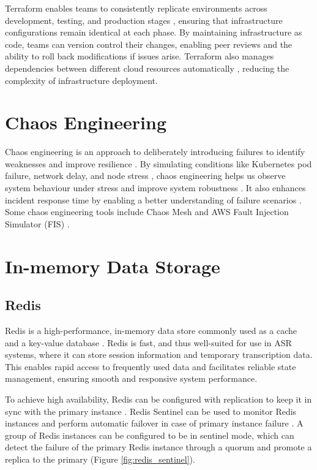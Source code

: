 Terraform enables teams to consistently replicate environments across development, testing, and production stages \cite{iac_benefits}, ensuring that infrastructure configurations remain identical at each phase. By maintaining infrastructure as code, teams can version control their changes, enabling peer reviews and the ability to roll back modifications if issues arise. Terraform also manages dependencies between different cloud resources automatically \cite{terraform_dependencies}, reducing the complexity of infrastructure deployment. 

\section{Chaos Engineering}
Chaos engineering is an approach to deliberately introducing failures to identify weaknesses and improve resilience \cite{chaos_engineering_definition}. By simulating conditions like Kubernetes pod failure, network delay, and node stress \cite{chaos_mesh_feature}, chaos engineering helps us observe system behaviour under stress and improve system robustness \cite{chaos_engineering_definition}. It also enhances incident response time by enabling a better understanding of failure scenarios \cite{chaos_engineering_definition}. Some chaos engineering tools include Chaos Mesh \cite{chaos_mesh_introduction} and AWS Fault Injection Simulator (FIS) \cite{fis_introduction}.

\section{In-memory Data Storage}
\subsection{Redis}
Redis is a high-performance, in-memory data store commonly used as a cache and a key-value database \cite{redis_definition}. Redis is fast, and thus well-suited for use in ASR systems, where it can store session information and temporary transcription data. This enables rapid access to frequently used data and facilitates reliable state management, ensuring smooth and responsive system performance. 

To achieve high availability, Redis can be configured with replication to keep it in sync with the primary instance \cite{redis_replication}. Redis Sentinel can be used to monitor Redis instances and perform automatic failover in case of primary instance failure \cite{redis_sentinel}. A group of Redis instances can be configured to be in sentinel mode, which can detect the failure of the primary Redis instance through a quorum and promote a replica to the primary (Figure \ref{fig:redis_sentinel}).

